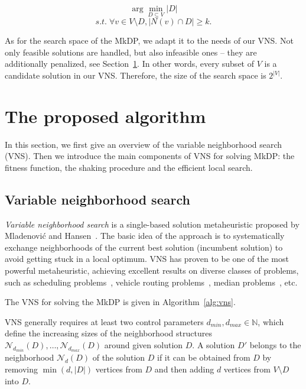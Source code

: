 \documentclass[dvipsnames,format=sigconf,anonymous=true,review=true]{acmart}
\begin{document}
\begin{equation}
\arg \min_{D \subseteq V } |D|
\end{equation}
\begin{equation}
	s.t. \; \forall v \in V \setminus D, |N(v) \cap D| \geq k.
\end{equation}
    
As for the search space of the MkDP, we adapt it to the needs of our VNS. Not only feasible solutions are handled, but also infeasible ones -- they are additionally penalized, see Section~\ref{sec:vns}. In other words, every subset of $V$ is a candidate solution in our VNS. Therefore, the size of the search space is $2^{|V|}$. 
   
   
\section{The proposed algorithm}\label{sec:vns}

In this section, we first give an overview of the variable neighborhood search (VNS). Then we introduce the main components of VNS for solving MkDP: the fitness function, the shaking procedure and the efficient local search.
 
  \subsection{Variable neighborhood search}
 \emph{Variable neighborhood search} is a single-based solution metaheuristic proposed by Mladenović and Hansen~\cite{mladenovic1997variable}. The basic idea of the approach is to systematically exchange neighborhoods of the current best solution (incumbent solution) to avoid getting stuck in a local optimum. VNS has proven to be one of the most powerful metaheuristic, achieving excellent results on diverse classes of problems, such as scheduling problems~\cite{fleszar2004solving}, vehicle routing problems~\cite{rezgui2019application}, median problems~\cite{herran2019variable}, etc.  
  
 The VNS for solving the MkDP is given in Algorithm~\ref{alg:vns}. 
 
 VNS generally requires at least two control parameters $d_{min}, d_{max} \in \mathbb{N}$, which define the increasing sizes of the neighborhood structures $\mathcal{N}_{d_{min}}(D), \ldots, \mathcal{N}_{d_{max}}(D)$ around given solution $D$. A solution $D'$ belongs to the neighborhood $\mathcal{N}_{d}(D)$ of the solution $D$ if it can be obtained from $D$ by removing $\min(d, |D|)$ vertices from $D$ and then adding $d$ vertices from $V \setminus D$ into $D$.
 
\end{document}
